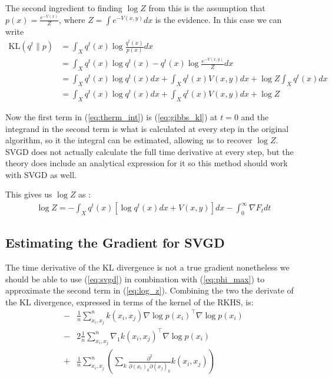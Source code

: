 \documentclass{article}
\begin{document}
The second ingredient to finding $\log Z$ from this is the assumption that $p(x) = \frac{ e^{-V(x)} }{ Z }$, 
where $Z = \int e^{-V(x, y)} dx$ is the evidence. In this case we can write
\begin{align}
\label{eq:gibbs_kl}
    \text{KL}( q^t \| p ) &= \int_X q^t(x) \log \frac{ q^t(x) }{ p(x) } dx \\
                    &= \int_X q^t(x) \log q^t(x) - q^t(x) \log \frac{ e^{-V(x, y)} }{ Z } dx \\
                    &= \int_X q^t(x) \log q^t(x) dx + \int_X q^t(x) V(x, y) dx + \log Z \int_X q^t(x) dx \\
                    &= \int_X q^t(x) \log q^t(x) dx + \int_X q^t(x) V(x, y) dx + \log Z
\end{align}

Now the first term in (\ref{eq:therm_int}) is (\ref{eq:gibbs_kl}) at $t=0$ and the integrand in the second term is
what is calculated at every step in the original algorithm, so it the integral can be estimated, allowing us to 
recover $\log Z$. SVGD does not actually calculate the full time derivative at every step, but the theory does 
include an analytical expression for it so this method should work with SVGD as well.

This gives us $\log Z$ as :
\begin{align}
\label{eq:log_z}
    \log Z = - \int_X q^t(x) [\log q^t(x) dx +  V(x, y)] dx 
        - \int_0^\infty \nabla F_t dt
\end{align}


\newpage
\subsection{Estimating the Gradient for SVGD}
The time derivative of the KL divergence is not a true gradient nonetheless we should be able to use
(\ref{eq:svgd}) in combination with (\ref{eq:phi_max}) to approximate the second term in (\ref{eq:log_z}).
Combining the two the derivate of the KL divergence, expressed in terms of the kernel of the RKHS, is:
\begin{align}
    \label{eq:F_approximation}
    -& \frac{1}{n}\sum_{x_i,x_j}^n  k(x_i,x_j) \nabla \log p(x_i)^\top \nabla \log p(x_i)  \\ 
    -& 2 \frac{1}{n}\sum_{x_i,x_j}^n  \nabla_{1} k(x_i,x_j)^\top \nabla \log p(x_i)  \\ 
    +& \frac{1}{n}\sum_{x_i,x_j}^n \left( \sum_k \frac{ \partial^2 }{ \partial (x_i)_k \partial (x_j)_k } 
        k(x_i,x_j) \right)
\end{align}
\end{document}
